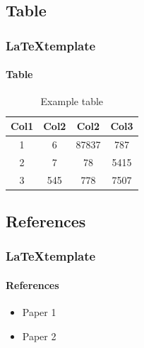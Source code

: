 \subsection{Table}
\begin{frame}
  \frametitle{\LaTeX template}
  \framesubtitle{Table}

  \begin{center}
    \begin{table}
      \begin{tabular}{|c|c|c|c|}
       \hline
       \rowcolor{tableFirstRowColor} Col1 & Col2 & Col2 & Col3 \\ [0.5ex]
       \hline
       \cellcolor{tableFirstColColor} 1 & 6 & 87837 & 787 \\
       \hline
       \cellcolor{tableFirstColColor} 2 & 7 & 78 & 5415 \\
       \hline
       \cellcolor{tableFirstColColor} 3 & 545 & 778 & 7507 \\
       \hline
      \end{tabular}
      \caption{Example table}
    \end{table}
  \end{center}
\end{frame}

\subsection{References}
\begin{frame}
  \frametitle{\LaTeX template}
  \framesubtitle{References}

  \begin{itemize}
    \item Paper 1 \cite{blattner2017model}
    \item Paper 2 \cite{bardakoff2020hedgehog}
  \end{itemize}
\end{frame}
